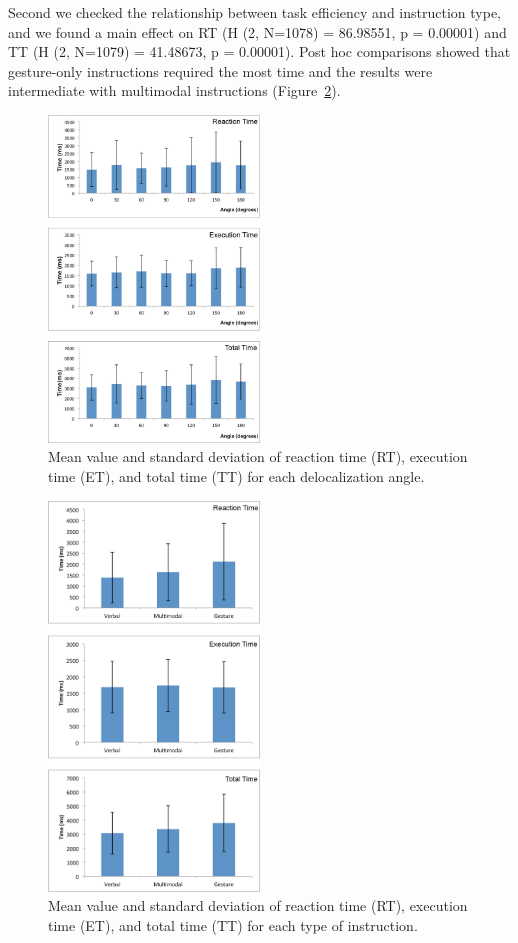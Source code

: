 Second we checked the relationship between task efficiency and instruction type, and we found a main effect on RT (H (2, N=1078) = 86.98551, p = 0.00001) and TT (H (2, N=1079) = 41.48673, p = 0.00001). Post hoc comparisons showed that gesture-only instructions required the most time and the results were intermediate with multimodal instructions (Figure~\ref{fig:3_instruction}).

\begin{figure}[tb]
  \centering
  \includegraphics[width=0.5\textwidth]{figures/ch3/angles}
  \caption{\label{fig:3_angles}Mean value and standard deviation of reaction time (RT), execution time (ET), and total time (TT) for each delocalization angle.}
\end{figure}

\begin{figure}[tb]
  \centering
  \includegraphics[width=0.5\textwidth]{figures/ch3/instruction}
  \caption{\label{fig:3_instruction}Mean value and standard deviation of reaction time (RT), execution time (ET), and total time (TT) for each type of instruction.}
\end{figure}

